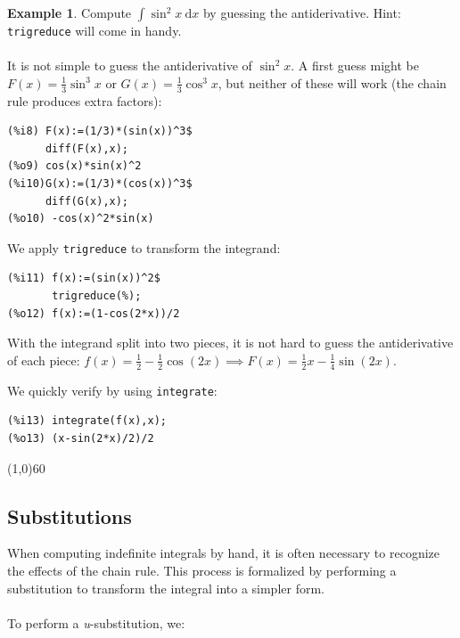 \documentclass[10.5pt,twoside]{report}
\theoremstyle{definition}
\newtheorem{exmp}{Example}[section]
\begin{document}
\begin{exmp}  Compute $\displaystyle \int \sin^2{x} \ \mathrm{d}x$ by guessing the antiderivative. Hint: \verb|trigreduce| will come in handy.\\
${}$\\

It is not simple to guess the antiderivative of $\sin^2{x}$.  A first guess might be $F(x)=\frac{1}{3} \sin^3{x}$ or $G(x)=\frac{1}{3} \cos^3{x}$, but neither of these will work (the chain rule produces extra factors):

\begin{verbatim}
(%i8) F(x):=(1/3)*(sin(x))^3$
      diff(F(x),x);
(%o9) cos(x)*sin(x)^2
(%i10)G(x):=(1/3)*(cos(x))^3$
      diff(G(x),x);
(%o10) -cos(x)^2*sin(x)
\end{verbatim}

We apply \verb|trigreduce| to transform the integrand:

\begin{verbatim}
(%i11) f(x):=(sin(x))^2$
       trigreduce(%);
(%o12) f(x):=(1-cos(2*x))/2
\end{verbatim}

With the integrand split into two pieces, it is not hard to guess the antiderivative of each piece:  $f(x)=\frac{1}{2}-\frac{1}{2} \cos{(2x)} \implies F(x)= \frac{1}{2} x - \frac{1}{4} \sin{(2x)}$.

We quickly verify by using \verb|integrate|:

\begin{verbatim}
(%i13) integrate(f(x),x);
(%o13) (x-sin(2*x)/2)/2
\end{verbatim}

\end{exmp}

\line(1,0){60}
\linethickness{0.5mm}



\subsection{Substitutions}

When computing indefinite integrals by hand, it is often necessary to recognize the effects of the chain rule.  This process is formalized by performing a substitution to transform the integral into a simpler form. \\
${}$\\
To perform a \textit{u}-substitution, we:
\end{document}
